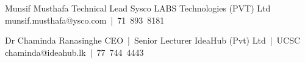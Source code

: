 

\begin{cventries}

    \cventry
    {Munsif Musthafa } %
    {Technical Lead} %
    {Sysco LABS Technologies (PVT) Ltd} %
    {munsif.musthafa@ysco.com~|~71~893~8181} %
    {
    }
    
    
    
    \cventry
    {Dr Chaminda Ranasinghe} %
    {CEO~|~Senior Lecturer} %
    {IdeaHub (Pvt) Ltd~|~UCSC} %
    {chaminda@ideahub.lk~|~77~744~4443} %
    {
    }



\end{cventries}
